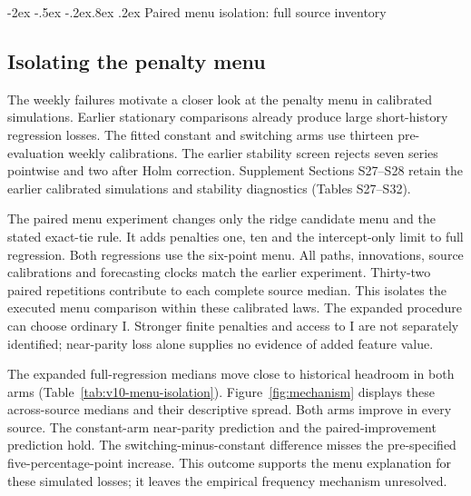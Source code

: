 \documentclass[10pt,a4paper]{article}
\makeatletter
\renewcommand\section{\@startsection{section}{1}{\z@}%
  {-2ex \@plus -.5ex \@minus -.2ex}{.8ex \@plus .2ex}%
  {\normalfont\large\bfseries}}
\makeatother
\begin{document}
\section{Paired menu isolation: full source inventory}\label{sup:v10-menu}

\subsection{Isolating the penalty menu}\label{sec:extensions}

The weekly failures motivate a closer look at the penalty menu in calibrated simulations. Earlier stationary comparisons already produce large short-history regression losses. The fitted constant and switching arms use thirteen pre-evaluation weekly calibrations. The earlier stability screen rejects seven series pointwise and two after Holm correction. Supplement Sections S27--S28 retain the earlier calibrated simulations and stability diagnostics (Tables S27--S32).

The paired menu experiment changes only the ridge candidate menu and the stated exact-tie rule. It adds penalties one, ten and the intercept-only limit to full regression. Both regressions use the six-point menu. All paths, innovations, source calibrations and forecasting clocks match the earlier experiment. Thirty-two paired repetitions contribute to each complete source median. This isolates the executed menu comparison within these calibrated laws. The expanded procedure can choose ordinary I. Stronger finite penalties and access to I are not separately identified; near-parity loss alone supplies no evidence of added feature value.

The expanded full-regression medians move close to historical headroom in both arms (Table~\ref{tab:v10-menu-isolation}). Figure~\ref{fig:mechanism} displays these across-source medians and their descriptive spread. Both arms improve in every source. The constant-arm near-parity prediction and the paired-improvement prediction hold. The switching-minus-constant difference misses the pre-specified five-percentage-point increase. This outcome supports the menu explanation for these simulated losses; it leaves the empirical frequency mechanism unresolved.
\end{document}
